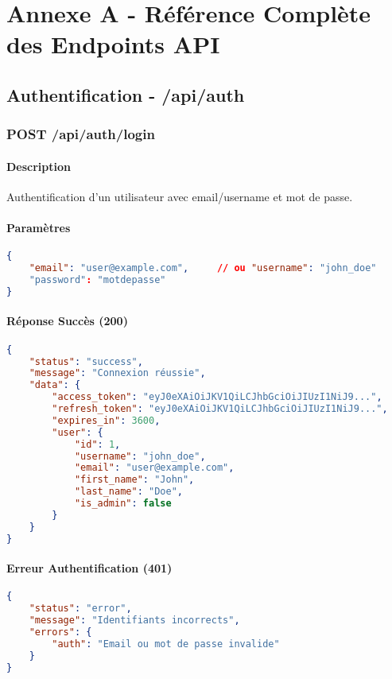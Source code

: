 \section{Annexe A - Référence Complète des Endpoints API}

\subsection{Authentification - /api/auth}

\subsubsection{POST /api/auth/login}

\paragraph{Description}
Authentification d'un utilisateur avec email/username et mot de passe.

\paragraph{Paramètres}
\begin{lstlisting}[language=json]
{
    "email": "user@example.com",     // ou "username": "john_doe"
    "password": "motdepasse"
}
\end{lstlisting}

\paragraph{Réponse Succès (200)}
\begin{lstlisting}[language=json]
{
    "status": "success",
    "message": "Connexion réussie",
    "data": {
        "access_token": "eyJ0eXAiOiJKV1QiLCJhbGciOiJIUzI1NiJ9...",
        "refresh_token": "eyJ0eXAiOiJKV1QiLCJhbGciOiJIUzI1NiJ9...",
        "expires_in": 3600,
        "user": {
            "id": 1,
            "username": "john_doe",
            "email": "user@example.com",
            "first_name": "John",
            "last_name": "Doe",
            "is_admin": false
        }
    }
}
\end{lstlisting}

\paragraph{Erreur Authentification (401)}
\begin{lstlisting}[language=json]
{
    "status": "error",
    "message": "Identifiants incorrects",
    "errors": {
        "auth": "Email ou mot de passe invalide"
    }
}
\end{lstlisting}

